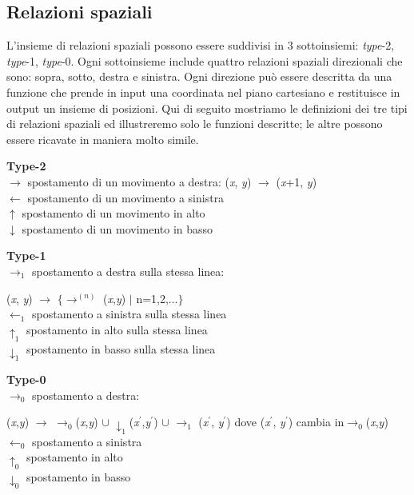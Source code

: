 \subsection{Relazioni spaziali}
L'insieme di relazioni spaziali \cite{pubblicazione: tomita} possono essere suddivisi in 3 sottoinsiemi: \textit{type}-2, \textit{type}-1, \textit{type}-0. Ogni sottoinsieme include quattro relazioni spaziali direzionali che sono: sopra, sotto, destra e sinistra. Ogni direzione può essere descritta da una funzione che prende in input una coordinata nel piano cartesiano e restituisce in output un insieme di posizioni. Qui di seguito mostriamo le definizioni dei tre tipi di relazioni spaziali ed illustreremo solo le funzioni descritte; le altre possono essere ricavate in maniera molto simile.
\begin{flushleft}
	\textbf{Type-2}  \\
	$\to$   spostamento  di un movimento a destra: (\textit{x}, \textit{y}) $\to$ (\textit{x}+1, \textit{y})\\
	$\gets$   spostamento  di un movimento a sinistra \\
	$\uparrow$   spostamento  di un movimento in alto \\
	$\downarrow$   spostamento  di un movimento in basso \par
	\vspace{0.2cm}\noindent \textbf{Type-1}  \\
	$\to_1$   spostamento a destra sulla stessa linea:\par 
	\hspace{0.5cm}(\textit{x}, \textit{y}) $\to$ $\{$$\to^{(n)}$  (\textit{x},\textit{y}) $\mid$ n=1,2,$\dots$$\}$ \\
	$\gets_1$ spostamento a sinistra sulla stessa linea\\
	$\uparrow_1$ spostamento in alto sulla stessa linea\\
	$\downarrow_1$ spostamento in basso sulla stessa linea \par
	\vspace{0.2cm}\noindent \textbf{Type-0}  \\
	$\to_0$  spostamento a destra: \par 
	(\textit{x},\textit{y}) $\to$   $\to_0$(\textit{x},\textit{y})  $\cup$ $\downarrow_1$(\textit{x}$^{'}$,\textit{y}$^{'}$) $\cup$ $\to_1$ (\textit{x}$^{'}$, \textit{y}$^{'}$) dove (\textit{x}$^{'}$, \textit{y}$^{'}$) cambia in$\to_0$(\textit{x},\textit{y})\\
	$\gets_0$ spostamento  a sinistra \\
	$\uparrow_0$ spostamento in alto \\
	$\downarrow_0$ spostamento in basso 
\end{flushleft}
